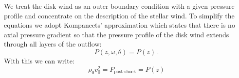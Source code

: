 We treat the disk wind as an outer boundary condition with a given pressure profile and concentrate on the description of the stellar wind. To simplify the equations we adopt Kompaneets' approximation \citep{1960SPhD....5...46K} which states that there is no axial pressure gradient so that the pressure profile of the disk wind extends through all layers of the outflow:
\begin{equation}
P(z, \omega, \theta) = P(z)\,.
\end{equation}
With this we can write:
\begin{equation}
\rho_0 v_0^2 = P_{\textrm{post-shock}} = P(z)
\end{equation}
